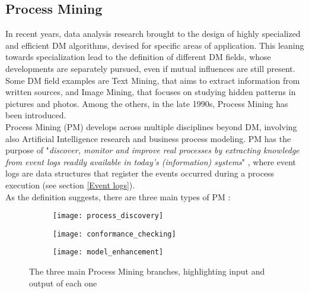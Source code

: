 \subsection{Process Mining}
In recent years, data analysis research brought to the design of highly specialized and efficient DM algorithms, devised for specific areas of application. This leaning towards specialization lead to the definition of different DM fields, whose developments are separately pursued, even if mutual influences are still present. Some DM field examples are Text Mining, that aims to extract information from written sources, and Image Mining, that focuses on studying hidden patterns in pictures and photos. Among the others, in the late 1990s, Process Mining has been introduced.\\
Process Mining (PM) develops across multiple disciplines beyond DM, involving also Artificial Intelligence research and business process modeling. PM has the purpose of "\textit{discover, monitor and improve real processes by extracting knowledge from event logs readily available in today's (information) systems}" \cite{VanDerAalstWil2012Pmm}, where event logs are data structures that register the events occurred during a process execution (see section \ref{Event logs}). \\As the definition suggests, there are three main types of PM \cite{Aalst16}:
\begin{figure}[h]
  \centering
  \begin{subfigure}[t]{0.9\textwidth}
    \texttt{[image: process\_discovery]}
    \caption{ }
    \label{fig:process_discovery}   
  \end{subfigure}
  \begin{subfigure}[h]{0.9\textwidth}
    \texttt{[image: conformance\_checking]}
    \caption{ }
    \label{fig:conformance_checking}   
  \end{subfigure}
  \begin{subfigure}[b]{0.9\textwidth}
    \texttt{[image: model\_enhancement]}
    \caption{ }
    \label{fig:model_enhancement}   
  \end{subfigure}
  \caption{The three main Process Mining branches, highlighting input and output of each one}
\end{figure}
